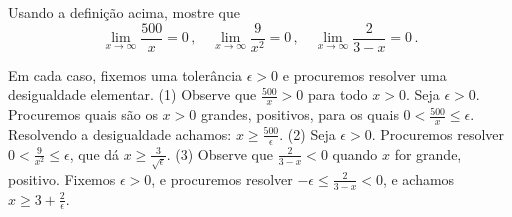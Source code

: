 \begin{exo}
Usando a definição acima, mostre que 
\[ 
\lim_{x\to\infty}\frac{500}{x}=0\,,\quad
\lim_{x\to\infty}\frac{9}{x^2}=0\,,\quad
\lim_{x\to\infty}\frac{2}{3-x}=0\,.
\]
\begin{sol}
Em cada caso, fixemos uma tolerância $\epsilon>0$ e procuremos resolver uma
desigualdade elementar.
(1) Observe que $\frac{500}{x}>0$ para todo $x>0$. Seja $\epsilon>0$. Procuremos
quais são os $x>0$ grandes, positivos, para os quais
$0<\frac{500}{x}\leq \epsilon$.
Resolvendo a desigualdade achamos: $x\geq \frac{500}{\epsilon}$.
(2) Seja $\epsilon>0$. Procuremos resolver $0<\frac{9}{x^2}\leq \epsilon$, que dá $x\geq
\frac{3}{\sqrt{\epsilon}}$.
(3) Observe que $\frac{2}{3-x}<0$ quando $x$ for grande, positivo. 
Fixemos $\epsilon>0$, e procuremos resolver
$-\epsilon\leq \frac{2}{3-x}<0$, e achamos $x\geq 3+\frac{2}{\epsilon}$.
\end{sol}
\end{exo}
